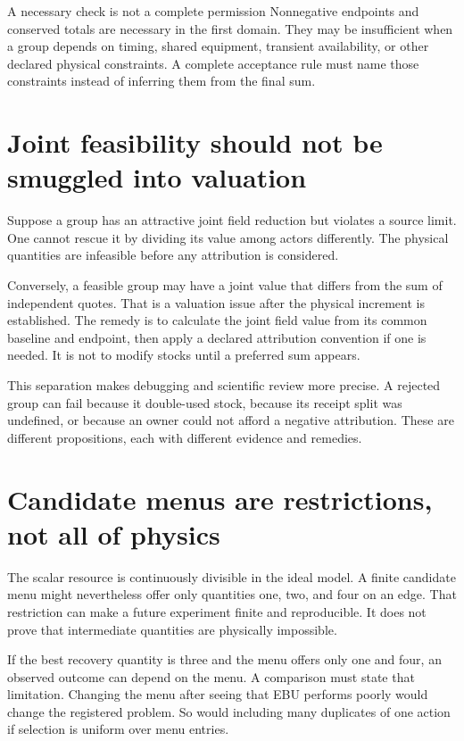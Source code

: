 \begin{cautionbox}{A necessary check is not a complete permission}
Nonnegative endpoints and conserved totals are necessary in the first domain. They may be insufficient when a group depends on timing, shared equipment, transient availability, or other declared physical constraints. A complete acceptance rule must name those constraints instead of inferring them from the final sum.
\end{cautionbox}

\section{Joint feasibility should not be smuggled into valuation}
Suppose a group has an attractive joint field reduction but violates a source limit. One cannot rescue it by dividing its value among actors differently. The physical quantities are infeasible before any attribution is considered.

Conversely, a feasible group may have a joint value that differs from the sum of independent quotes. That is a valuation issue after the physical increment is established. The remedy is to calculate the joint field value from its common baseline and endpoint, then apply a declared attribution convention if one is needed. It is not to modify stocks until a preferred sum appears.

This separation makes debugging and scientific review more precise. A rejected group can fail because it double-used stock, because its receipt split was undefined, or because an owner could not afford a negative attribution. These are different propositions, each with different evidence and remedies.

\section{Candidate menus are restrictions, not all of physics}
The scalar resource is continuously divisible in the ideal model. A finite candidate menu might nevertheless offer only quantities one, two, and four on an edge. That restriction can make a future experiment finite and reproducible. It does not prove that intermediate quantities are physically impossible.

If the best recovery quantity is three and the menu offers only one and four, an observed outcome can depend on the menu. A comparison must state that limitation. Changing the menu after seeing that EBU performs poorly would change the registered problem. So would including many duplicates of one action if selection is uniform over menu entries.

